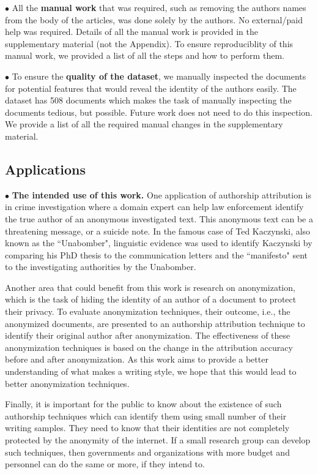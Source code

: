 \documentclass[11pt]{article}
\begin{document}
\noindent$\bullet$ All the \textbf{manual work} that was required, such as removing the authors names from the body of the articles, was done solely by the authors. No external/paid help was required. Details of all the manual work is provided in the supplementary material (not the Appendix). To ensure reproduciblity of this manual work, we provided a list of all the steps and how to perform them. 

\noindent$\bullet$ To ensure the \textbf{quality of the dataset}, we manually inspected the documents for potential features that would reveal the identity of the authors easily. The dataset has 508 documents which makes the task of manually inspecting the documents tedious, but possible. Future work does not need to do this inspection. We provide a list of all the required manual changes in the supplementary material. 

\subsection{Applications}
\noindent$\bullet$ \textbf{The intended use of this work.} One application of authorship attribution is in crime investigation where a domain expert can help law enforcement identify the true author of an anonymous investigated text. This anonymous text can be a threatening message, or a suicide note. In the famous case of Ted Kaczynski, also known as the ``Unabomber", linguistic evidence was used to identify Kaczynski by comparing his PhD thesis to the communication letters and the ``manifesto" sent to the investigating authorities by the Unabomber. 

Another area that could benefit from this work is research on anonymization, which is the task of hiding the identity of an author of a document to protect their privacy. To evaluate anonymization techniques, their outcome, i.e., the anonymized documents, are presented to an authorship attribution technique to identify their original author after anonymization. The effectiveness of these anonymization techniques is based on the change in the attribution accuracy before and after anonymization. As this work aims to provide a better understanding of what makes a writing style, we hope that this would lead to better anonymization techniques. 

Finally, it is important for the public to know about the existence of such authorship techniques which can identify them using small number of their writing samples. They need to know that their identities are not completely protected by the anonymity of the internet. If a small research group can develop such techniques, then governments and organizations with more budget and personnel can do the same or more, if they intend to. 
\end{document}
